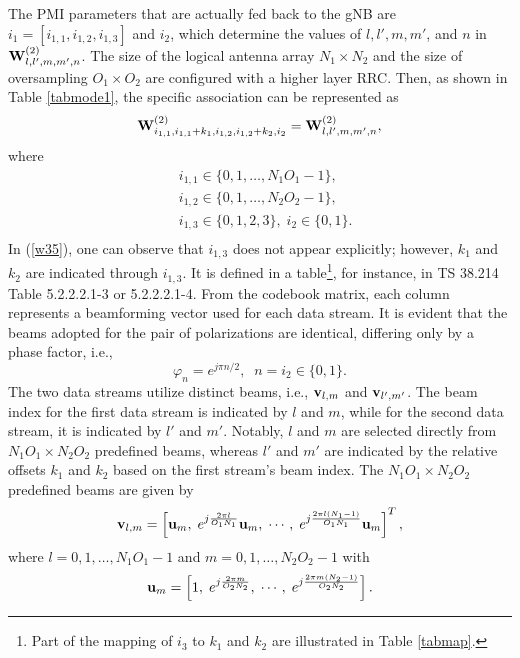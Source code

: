 \documentclass[lettersize,journal]{IEEEtran}
\begin{document}
The PMI parameters that are actually fed back to the gNB are $i_1=[i_{1,1},i_{1,2},i_{1,3}]$ and $i_2$, which determine the values of $l,l',m,m'$,  and $n$ in ${\bf{W}}^{(2)}_{l,l',m,m',n}$. 
The size of the logical antenna array $N_1 \times N_2$ and the size of oversampling $O_1 \times O_2$ are configured with a higher layer RRC. Then, as shown in Table \ref{tabmode1}, the specific association can be represented as
\begin{equation} \label{w35}
    {\bf{W}}^{(2)}_{i_{1,1},i_{1,1}+k_1,i_{1,2},i_{1,2}+k_2,i_2} = {\bf{W}}^{(2)}_{l,l',m,m',n},
\end{equation}
where
\begin{equation}
 \begin{aligned}
&{i_{1,1}} \in \{ 0,1, \ldots ,{N_1}{O_1} - 1\}, \\
&{i_{1,2}} \in \{ 0,1, \ldots ,{N_2}{O_2} - 1\}, \\
&{i_{1,3}} \in \{ 0,1,2,3\},\; {i_2} \in \{ 0,1\} .\\
\end{aligned}
\end{equation}
In (\ref{w35}), one can observe that $i_{1,3}$ does not appear explicitly; however, $k_1$ and $k_2$ are indicated through $i_{1,3}$. It is defined in a table\footnote{Part of the mapping of $i_3$ to $k_1$ and $k_2$ are illustrated in Table \ref{tabmap}.}, for instance, in TS 38.214 Table 5.2.2.2.1-3 or 5.2.2.2.1-4.  From the codebook matrix, each column represents a beamforming vector used for each data stream. It is evident that the beams adopted for the pair of polarizations are identical, differing only by a phase factor, i.e.,
\begin{equation}\label{phase}
 \varphi_n =e^{j\pi n /2}, \;\; n=i_2 \in \{0,1\}.
\end{equation}
The two data streams utilize distinct beams, i.e., ${\bf{v}}_{l,m}$ and ${\bf{v}}_{l',m'}$. The beam index for the first data stream is indicated by $l$ and $m$, while for the second data stream, it is indicated by $l'$ and $m'$. Notably, $l$ and $m$ are selected directly from $N_1O_1 \times N_2O_2$ predefined beams, whereas $l'$ and $m'$ are indicated by the relative offsets $k_1$ and $k_2$ based on the first stream's beam index. The $N_1O_1 \times N_2O_2$ predefined beams are given by 
\begin{equation}\label{beamv}
 {\bf{v}}_{l,m}=\left[ {\bf{u}}_m,\; e^{j\frac{2\pi l}{O_1N_1}}{\bf{u}}_m,\;\cdots, \;e^{j\frac{2\pi l(N_1-1)}{O_1N_1}}{\bf{u}}_m \right]^T,
\end{equation}
where $l=0,1,\ldots,N_1O_1-1$ and $m=0,1,\ldots,N_2O_2-1$ with
\begin{equation}
{\bf{u}}_m=\left[ 1, \; e^{j\frac{2\pi m}{O_2N_2}  },\; \cdots,\; e^{j\frac{2\pi m(N_2-1)}{O_2N_2}  }\right].
\end{equation}
\end{document}
